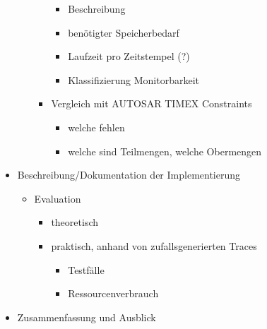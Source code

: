 \documentclass[]{article}
\begin{document}
\begin{itemize}
\begin{itemize}
\begin{itemize}
						\begin{itemize}
							\item
								Beschreibung
							\item
								benötigter Speicherbedarf
							\item
								Laufzeit pro Zeitstempel (?)
							\item
								Klassifizierung Monitorbarkeit
						\end{itemize}
					\item
						Vergleich mit AUTOSAR TIMEX Constraints
						\begin{itemize}
							\item
								welche fehlen
							\item
								welche sind Teilmengen, welche Obermengen 
						\end{itemize}
				\end{itemize}
		\end{itemize}
	\item
		Beschreibung/Dokumentation der Implementierung
		\begin{itemize}
			\item
				Evaluation
				\begin{itemize}
					\item
						theoretisch
					\item
						praktisch, anhand von zufallsgenerierten Traces
						\begin{itemize}
							\item
								Testfälle
							\item
								Ressourcenverbrauch
						\end{itemize}
				\end{itemize}
		\end{itemize}
	\item
		Zusammenfassung und Ausblick
\end{itemize}
\end{document}

